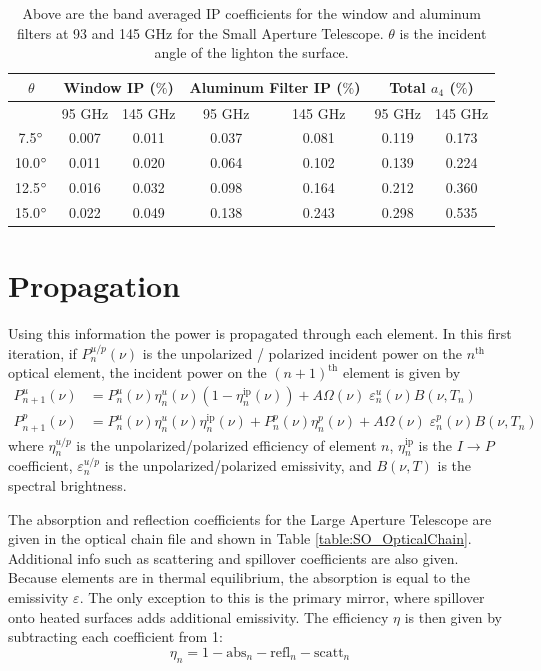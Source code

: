 \documentclass{article}
\theoremstyle{remark}
\newcommand{\tab}{\hspace*{2em}}
\renewcommand{\t}[1]{\text{#1}}
\newcommand{\ip}{$I\rightarrow P$ }
\begin{document}
\begin{table}[h]
\centering

\begin{tabular}{|c|c|c|c|c|c|c|}
\hline
$\theta $       & \multicolumn{2}{|c|}{Window IP ($\%$)} & \multicolumn{2}{|c|}{Aluminum Filter IP ($\%$)}  & \multicolumn{2}{|c|}{Total $a_4$ ($\%$)}           \\
\hline
 & 95 GHz & 145 GHz & 95 GHz & 145 GHz & 95 GHz & 145 GHz\\
 \hline
7.5$\degree$ & 0.007 & 0.011 & 0.037 & 0.081 & 0.119 & 0.173\\
10.0$\degree$ & 0.011 & 0.020 & 0.064 & 0.102 & 0.139 & 0.224\\
12.5$\degree$ & 0.016 & 0.032 & 0.098 & 0.164 & 0.212 & 0.360\\
15.0$\degree$ & 0.022 & 0.049 & 0.138 & 0.243 & 0.298 & 0.535\\
\hline
\end{tabular}
\caption{ Above are the band averaged IP coefficients for the window and aluminum filters at 93 and 145 GHz for the Small Aperture Telescope.
 $\theta$ is the incident angle of the lighton the surface.
}
\label{table:SAT_ip}
\end{table}

\section{Propagation}

\tab Using this information the power is propagated through each element.
In this first iteration, if $P_{n}^{u/p}(\nu)$ is the unpolarized / polarized incident power on the $n^\t{th}$ optical element, 
the incident power on the $(n+1)^\t{th}$ element is given by
\begin{align}
P_{n+1}^u(\nu) &= P_n^u(\nu) \eta_n^u(\nu) (1 - \eta_n^{\t{ip}}(\nu)) + A\Omega(\nu) \; \varepsilon_n^u(\nu) B(\nu,T_n)\\
P_{n+1}^p(\nu) &= P_n^u(\nu) \eta_n^u(\nu) \eta_n^{\t{ip}}(\nu) +  P_n^p(\nu) \eta_n^p(\nu) + A\Omega(\nu) \; \varepsilon_n^p(\nu) B(\nu,T_n)
\end{align}
where $\eta_n^{u/p}$ is the unpolarized/polarized efficiency of element $n$, $\eta_n^\t{ip}$ is the \ip coefficient, $\varepsilon_n^{u/p}$
is the unpolarized/polarized emissivity, and $B(\nu,T)$ is the spectral brightness.

\tab The absorption and reflection coefficients for the Large Aperture Telescope are given in the optical chain file and shown in Table 
\ref{table:SO_OpticalChain}. Additional info such as scattering and spillover coefficients are also given.
Because elements are in thermal equilibrium, the absorption is equal to the emissivity $\varepsilon$.
The only exception to this is the primary mirror, where spillover onto heated surfaces adds additional emissivity.
The efficiency $\eta$ is then given by subtracting each coefficient from 1:
\[\eta_n = 1 - \t{abs}_n - \t{refl}_n - \t{scatt}_n\]
\end{document}
